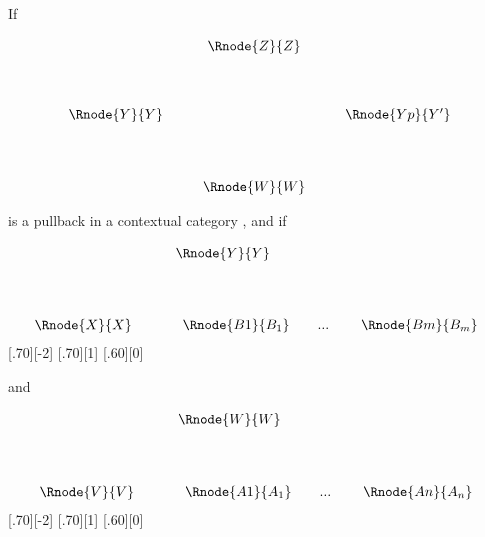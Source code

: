 \documentclass[10pt,a4paper]{scrartcl}
\newcommand{\ccatc}{contextual category \ccat}
\begin{document}
\begin{lemma}
If 
\begin{center}
\begin{equation}
\label{ddtwopb}
\begin{array}{cp{0.3cm}c    p{0.3cm}  c }
               & & \Rnode{Z}{Z} & &                                  \\ [1.3cm]
\Rnode{Y}{Y}   &&                               & & \Rnode{Yp}{Y'}   \\ [1.4cm]
               & & \Rnode{W}{W} & &   
\end{array}
\end{equation}
\end{center}

\noindent
is a pullback in a \ccatc,
and if 
\begin{center}
\begin{equation}
\label{ddtwoYlimit}
\begin{array}{c p{0.4cm} l  }
 && \Rnode{Y}{Y}  \\ [1.4cm]
\Rnode{X}{X} &&
\begin{array}{cp{0cm}c   p{0.1cm}     c  }					
                             \Rnode{B1}{B_1}&   & ... & & \Rnode{Bm}{B_{m}}
	                      \end{array}           
\end{array} 
\end{equation}
[.70][-2]
[.70][1]
[.60][0]
\end{center}

\noindent
and
\begin{center}
\begin{equation}
\label{ddtwoWlimit}
\begin{array}{c p{0.4cm} l  }
 && \Rnode{W}{W}  \\ [1.4cm]
\Rnode{V}{V} &&
\begin{array}{cp{0cm}c   p{0.1cm}     c  }					
                             \Rnode{A1}{A_1}&   & ... & & \Rnode{An}{A_n}
	                      \end{array}         
\end{array} 
\end{equation}
[.70][-2]
[.70][1]
[.60][0]
\end{center}


\end{lemma}
\end{document}
